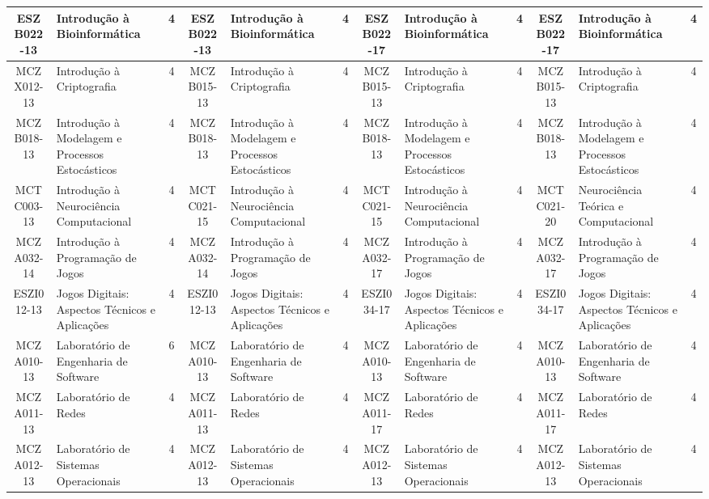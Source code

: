 \documentclass[a4paper]{article}
\begin{document}
\begin{landscape}
{\begin{longtable}{|c|p{.2\textheight}|c||c|p{.2\textheight}|c||c|p{.2\textheight}|c||c|p{.2\textheight}|c|}
ESZB022-13 & Introdução à Bioinformática & 4 &
ESZB022-13 & Introdução à Bioinformática & 4 &
ESZB022-17 & Introdução à Bioinformática & 4 & 
ESZB022-17 & Introdução à Bioinformática & 4\\ \hline

MCZX012-13 & Introdução à Criptografia & 4 &
MCZB015-13 & Introdução à Criptografia & 4 &
MCZB015-13 & Introdução à Criptografia & 4 & 
MCZB015-13 & Introdução à Criptografia & 4\\ \hline

MCZB018-13 & Introdução à Modelagem e Processos Estocásticos & 4 &
MCZB018-13 & Introdução à Modelagem e Processos Estocásticos & 4 &
MCZB018-13 & Introdução à Modelagem e Processos Estocásticos & 4 &
MCZB018-13 & Introdução à Modelagem e Processos Estocásticos & 4\\ \hline

MCTC003-13 & Introdução à Neurociência Computacional & 4 &
MCTC021-15 & Introdução à Neurociência Computacional & 4 &
MCTC021-15 & Introdução à Neurociência Computacional & 4 & 
MCTC021-20 & Neurociência Teórica e Computacional    & 4\\ \hline

MCZA032-14 & Introdução à Programação de Jogos & 4 &
MCZA032-14 & Introdução à Programação de Jogos & 4 &
MCZA032-17 & Introdução à Programação de Jogos & 4 &
MCZA032-17 & Introdução à Programação de Jogos & 4\\ \hline

ESZI012-13 & Jogos Digitais: Aspectos Técnicos e Aplicações & 4 &
ESZI012-13 & Jogos Digitais: Aspectos Técnicos e Aplicações & 4 &
ESZI034-17 & Jogos Digitais: Aspectos Técnicos e Aplicações & 4 &
ESZI034-17 & Jogos Digitais: Aspectos Técnicos e Aplicações & 4\\ \hline

MCZA010-13 & Laboratório de Engenharia de Software & 6 &
MCZA010-13 & Laboratório de Engenharia de Software & 4 &
MCZA010-13 & Laboratório de Engenharia de Software & 4 &
MCZA010-13 & Laboratório de Engenharia de Software & 4\\ \hline

MCZA011-13 & Laboratório de Redes & 4 &
MCZA011-13 & Laboratório de Redes & 4 &
MCZA011-17 & Laboratório de Redes & 4 &
MCZA011-17 & Laboratório de Redes & 4\\ \hline

MCZA012-13 & Laboratório de Sistemas Operacionais & 4 &
MCZA012-13 & Laboratório de Sistemas Operacionais & 4 &
MCZA012-13 & Laboratório de Sistemas Operacionais & 4 & 
MCZA012-13 & Laboratório de Sistemas Operacionais & 4\\ \hline


\end{longtable}}
\end{landscape}
\end{document}
